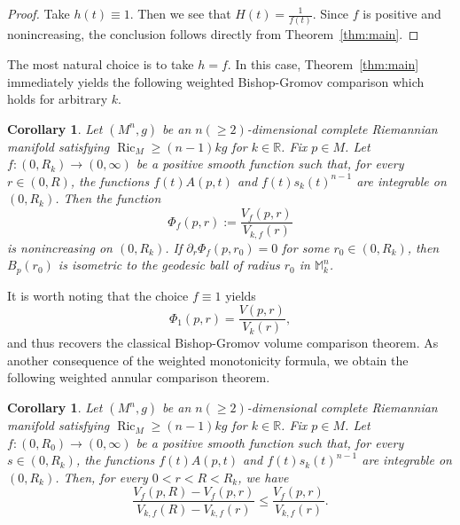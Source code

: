 \documentclass[11pt]{article}
\newtheorem{corollary}[theorem]{Corollary}
\newcommand{\Ric}{\operatorname{Ric}}
\begin{document}
\begin{proof}
Take $h(t)\equiv1$. Then we see that $H(t)=\frac{1}{f(t)}$. Since $f$ is positive and nonincreasing, the conclusion follows directly from Theorem~\ref{thm:main}.
\end{proof}
















The most natural choice is to take $h=f$. In this case, Theorem~\ref{thm:main} immediately yields the following weighted Bishop-Gromov comparison which holds for arbitrary $k$.

\begin{corollary} 
\label{cor:weighted-bg}
Let $(M^n,g)$ be an $n(\geq 2)$-dimensional complete Riemannian manifold satisfying $\Ric_M\geq(n-1)kg$ for $k \in \mathbb{R}$. Fix \(p\in M\). Let $f\colon(0,R_k)\rightarrow(0,\infty)$ be a positive smooth function such that, for every
\(r\in(0,R)\), the functions $f(t)A(p,t)$ and $f(t)s_k(t)^{n-1}$ are integrable on \((0,R_k)\). Then the function
$$
\Phi_f(p,r) := \frac{V_f(p,r)}{V_{k,f}(r)}
$$
is nonincreasing on \((0,R_k)\). If $\partial_r\Phi_f(p,r_0)=0$ for some $r_0 \in (0,R_k)$, then \(B_p(r_0)\) is isometric to the geodesic ball of radius $r_0$ in \(\mathbb M_k^n\).
\end{corollary}

\noindent It is worth noting that the choice $f\equiv1$ yields
$$
\Phi_1(p,r)=\frac{V(p,r)}{V_k(r)},
$$
and thus recovers the classical Bishop-Gromov volume comparison theorem. As another consequence of the weighted monotonicity formula, we obtain the following weighted annular comparison theorem.
\begin{corollary} 
\label{cor:weighted-annular}
Let $(M^n,g)$ be an $n(\geq 2)$-dimensional complete Riemannian manifold satisfying $\Ric_M\geq(n-1)kg$ for $k \in \mathbb{R}$. Fix \(p\in M\). Let $f\colon(0,R_0)\rightarrow(0,\infty)$ be a positive smooth function such that, for every
\(s\in(0,R_k)\), the functions $f(t)A(p,t)$ and $f(t)s_k(t)^{n-1}$ are integrable on \((0,R_k)\). Then, for every \(0<r<R<R_k\), we have
$$
\frac{V_f(p,R)-V_f(p,r)}{V_{k,f}(R)-V_{k,f}(r)} \leq \frac{V_f(p,r)} {V_{k,f}(r)}.
$$
\end{corollary}
\end{document}
